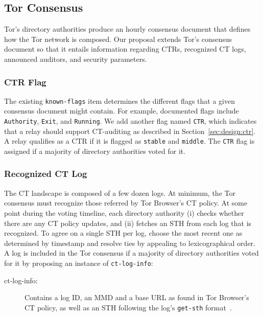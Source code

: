 \subsection{Tor Consensus}
Tor's directory authorities produce an hourly consensus document that defines
how the Tor network is composed.  Our proposal extends Tor's consensus document
so that it entails information regarding
	CTRs,
	recognized CT logs,
	announced auditors, and
	security parameters.

\subsubsection{CTR Flag}
The existing \texttt{known-flags} item determines the different flags that a
given consensus document might contain.  For example, documented flags include
\texttt{Authority}, \texttt{Exit}, and \texttt{Running}.  We add another flag
named \texttt{CTR}, which indicates that a relay should support CT-auditing as
described in Section~\ref{sec:design:ctr}.  A relay qualifies as a CTR if it is
flagged as \texttt{stable} and \texttt{middle}.  The \texttt{CTR} flag is
assigned if a majority of directory authorities voted for it.


\subsubsection{Recognized CT Log}
The CT landscape is composed of a few dozen logs.  At minimum, the Tor
consensus must recognize those referred by Tor Browser's CT policy.  At some
point during the voting timeline, each directory authority
(i) checks whether there are any CT policy updates, and
(ii) fetches an STH from each log that is recognized.
To agree on a single STH per log, choose the most recent one as determined by
timestamp and resolve ties by appealing to lexicographical order.  A log is
included in the Tor consensus if a majority of directory authorities voted
for it by proposing an instance of \texttt{ct-log-info}:
\begin{description}
	\item[ct-log-info:] Contains a log ID, an MMD and a base URL as found in
		Tor Browser's CT policy, as well as an STH following the log's
		\texttt{get-sth} format~\cite{ct,ct/bis}.
\end{description}

